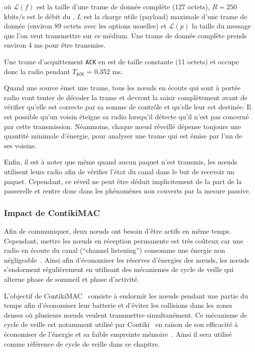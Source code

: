 où $\mathcal{L}(f)$ est la taille d'une trame de donnée complète \ieee{} (127 octets), $R = 250$ kbits/s est le débit du \ieee{}, $L$ est la charge utile (payload) maximale d'une trame de donnée \ieee{} (environ 89 octets avec les options usuelles) et $\mathcal{L}(p)$ la taille du message que l'on veut transmettre sur ce médium.
Une trame de donnée complète prends environ 4 ms pour être transmise.

Une trame d'acquittement \texttt{ACK} en \ieee{} est de taille constante (11 octets) et occupe donc la radio pendant $T_\texttt{ACK}$ = 0.352 ms.

Quand une source émet une trame, tous les nœuds en écoute qui sont à portée radio vont tenter de décoder la trame et devront la saisir complètement avant de vérifier qu'elle est correcte par sa somme de contrôle et qu'elle leur est destinée.
Il est possible qu'un voisin éteigne sa radio lorsqu'il détecte qu'il n'est pas concerné par cette transmission.
Néanmoins, chaque nœud réveillé dépense toujours une quantité minimale d'énergie, pour analyser une trame qui est émise par l'un de ses voisins.

Enfin, il est à noter que même quand aucun paquet n'est transmis, les nœuds utilisent leurs radio afin de vérifier l'état du canal dans le but de recevoir un paquet.
Cependant, ce réveil ne peut être déduit implicitement de la part de la passerelle et rentre donc dans les phénomènes non couverts par la mesure passive.

\subsubsection{Impact de ContikiMAC}
\label{supervision:contikimac}

Afin de communiquer, deux nœuds ont besoin d'être actifs en même temps.
Cependant, mettre les nœuds en réception permanente est très coûteux car une radio en écoute du canal (``channel listening'') consomme une énergie non négligeable~\cite{park2005throughput}.
Ainsi afin d'économiser les réserves d'énergies des nœuds, les nœuds s'endorment régulièrement en utilisant des mécanismes de cycle de veille qui alterne phase de sommeil et phase d'activité.

L’objectif de  ContikiMAC~\cite{dunkels11contikimac} consiste à endormir les nœuds pendant une partie du temps afin d’économiser leur batterie et d’éviter les collisions dans les zones denses où plusieurs nœuds veulent transmettre simultanément.
Ce mécanisme de cycle de veille est notamment utilisé par Contiki~\cite{dunkels2004contiki} en raison de son efficacité à économiser de l'énergie et sa faible empreinte mémoire~\cite{michel2014analyse}.
Ainsi il sera utilisé comme référence de cycle de veille dans ce chapitre.

